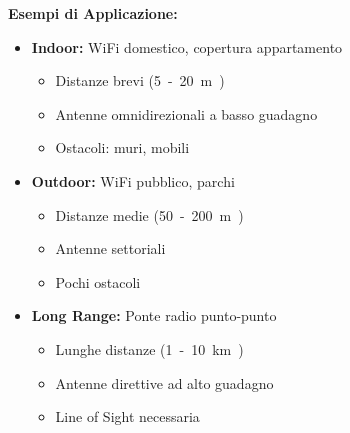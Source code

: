 \textbf{Esempi di Applicazione:}
\begin{itemize}
    \item \textbf{Indoor:} WiFi domestico, copertura appartamento
    \begin{itemize}
        \item Distanze brevi (\SI{5}-\SI{20}{m})
        \item Antenne omnidirezionali a basso guadagno
        \item Ostacoli: muri, mobili
    \end{itemize}
    
    \item \textbf{Outdoor:} WiFi pubblico, parchi
    \begin{itemize}
        \item Distanze medie (\SI{50}-\SI{200}{m})
        \item Antenne settoriali
        \item Pochi ostacoli
    \end{itemize}
    
    \item \textbf{Long Range:} Ponte radio punto-punto
    \begin{itemize}
        \item Lunghe distanze (\SI{1}-\SI{10}{km})
        \item Antenne direttive ad alto guadagno
        \item Line of Sight necessaria
    \end{itemize}
\end{itemize}

